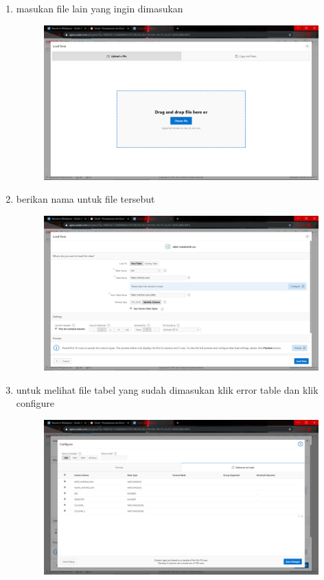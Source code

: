 \begin{enumerate}
\item masukan file lain yang ingin dimasukan 
\begin{figure}[H]
    \centering
    \includegraphics[scale=0.1]{figures/14}
    \caption{}
    \label{Figureanaconda70}
\end{figure}


\item berikan nama untuk file tersebut 
\begin{figure}[H]
    \centering
    \includegraphics[scale=0.1]{figures/15}
    \caption{}
    \label{Environment1}
\end{figure}

\item untuk melihat file tabel yang sudah dimasukan klik error table dan klik configure
\begin{figure}[H]
    \centering
    \includegraphics[scale=0.1]{figures/16}
    \caption{}
    \label{Environment2}
\end{figure}


\end{enumerate}
